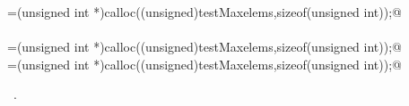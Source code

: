 \documentclass[12pt]{article}
\begin{document}
\begin{flushleft}
\begin{minipage}{\linewidth}
\begin{list}{}{}
\mbox{}\verb@theRi=(unsigned int *)calloc((unsigned)testMaxelems,sizeof(unsigned int));@\\
\mbox{}\verb@@\\
\mbox{}\verb@prow=(unsigned int *)calloc((unsigned)testMaxelems,sizeof(unsigned int));@\\
\mbox{}\verb@pcol=(unsigned int *)calloc((unsigned)testMaxelems,sizeof(unsigned int));@\\
\mbox{}\verb@@{\NWsep}
\end{list}
\vspace{-1.5ex}
\footnotesize
\begin{list}{}{\setlength{\itemsep}{-\parsep}\setlength{\itemindent}{-\leftmargin}}
\item \NWtxtMacroRefIn\ .

\item{}
\end{list}
\end{minipage}\vspace{4ex}
\end{flushleft}
\end{document}
